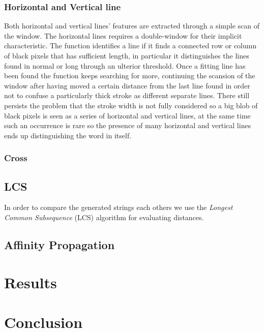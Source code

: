 \documentclass[a4paper,12pt]{article}
\begin{document}
\subsubsection{Horizontal and Vertical line}
Both horizontal and vertical lines' features are extracted through
a simple scan of the window.
The horizontal lines requires a double-window for their implicit characteristic.
The function identifies a line if it finds a connected row or column of black pixels that has sufficient length, in particular it distinguishes the lines found in normal or long through an ulterior threshold.
Once a fitting line has been found the function keeps searching for more, continuing the scansion of the window after having moved a certain distance from the last line found in order not to confuse a particularly thick stroke as different separate lines.
There still persists the problem that the stroke width is not fully considered so a big blob of black pixels is seen as a series of horizontal and vertical lines, at the same time such an occurrence is rare so the presence of many horizontal and vertical lines ends up distinguishing the word in itself.     

\subsubsection{Cross}  
  
\subsection{LCS} 

In order to compare the generated strings each others we use the \emph{Longest Common Subsequence} (LCS) algorithm for evaluating distances.

 
 
\subsection{Affinity Propagation}

\section{Results}

\section{Conclusion} 
\end{document}

